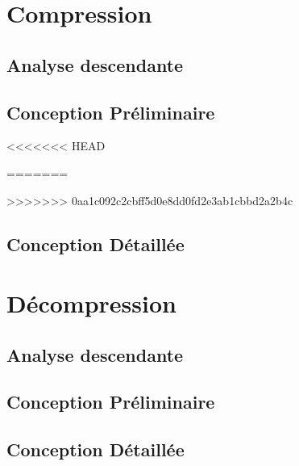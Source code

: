 \documentclass[10pt]{report}
\begin{document}
    \chapter{Compression}
        \section{Analyse descendante}
        \section{Conception Préliminaire}
            
            
            
            
            
            
<<<<<<< HEAD
            
           
=======
            
>>>>>>> 0aa1c092c2cbff5d0e8dd0fd2e3ab1cbbd2a2b4c
        \section{Conception Détaillée}
            
            
            
            
            
            
            
            
        \chapter{Décompression}
        \section{Analyse descendante}
        \section{Conception Préliminaire}
        	
        	
        	
        	
        	
        	
        \section{Conception Détaillée}
        	
        	
\end{document}
